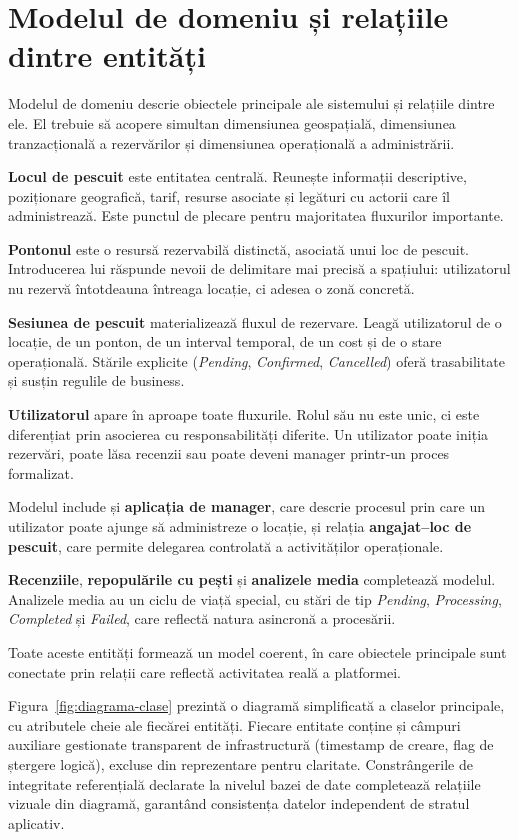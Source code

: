 \section{Modelul de domeniu și relațiile dintre entități}

Modelul de domeniu descrie obiectele principale ale sistemului și relațiile dintre ele. El trebuie să acopere simultan dimensiunea geospațială, dimensiunea tranzacțională a rezervărilor și dimensiunea operațională a administrării.

\textbf{Locul de pescuit} este entitatea centrală. Reunește informații descriptive, poziționare geografică, tarif, resurse asociate și legături cu actorii care îl administrează. Este punctul de plecare pentru majoritatea fluxurilor importante.

\textbf{Pontonul} este o resursă rezervabilă distinctă, asociată unui loc de pescuit. Introducerea lui răspunde nevoii de delimitare mai precisă a spațiului: utilizatorul nu rezervă întotdeauna întreaga locație, ci adesea o zonă concretă.

\textbf{Sesiunea de pescuit} materializează fluxul de rezervare. Leagă utilizatorul de o locație, de un ponton, de un interval temporal, de un cost și de o stare operațională. Stările explicite (\emph{Pending}, \emph{Confirmed}, \emph{Cancelled}) oferă trasabilitate și susțin regulile de business.

\textbf{Utilizatorul} apare în aproape toate fluxurile. Rolul său nu este unic, ci este diferențiat prin asocierea cu responsabilități diferite. Un utilizator poate iniția rezervări, poate lăsa recenzii sau poate deveni manager printr-un proces formalizat.

Modelul include și \textbf{aplicația de manager}, care descrie procesul prin care un utilizator poate ajunge să administreze o locație, și relația \textbf{angajat--loc de pescuit}, care permite delegarea controlată a activităților operaționale.

\textbf{Recenziile}, \textbf{repopulările cu pești} și \textbf{analizele media} completează modelul. Analizele media au un ciclu de viață special, cu stări de tip \emph{Pending}, \emph{Processing}, \emph{Completed} și \emph{Failed}, care reflectă natura asincronă a procesării.

Toate aceste entități formează un model coerent, în care obiectele principale sunt conectate prin relații care reflectă activitatea reală a platformei.

Figura~\ref{fig:diagrama-clase} prezintă o diagramă simplificată a claselor principale, cu atributele cheie ale fiecărei entități. Fiecare entitate conține și câmpuri auxiliare gestionate transparent de infrastructură (timestamp de creare, flag de ștergere logică), excluse din reprezentare pentru claritate. Constrângerile de integritate referențială declarate la nivelul bazei de date completează relațiile vizuale din diagramă, garantând consistența datelor independent de stratul aplicativ.

